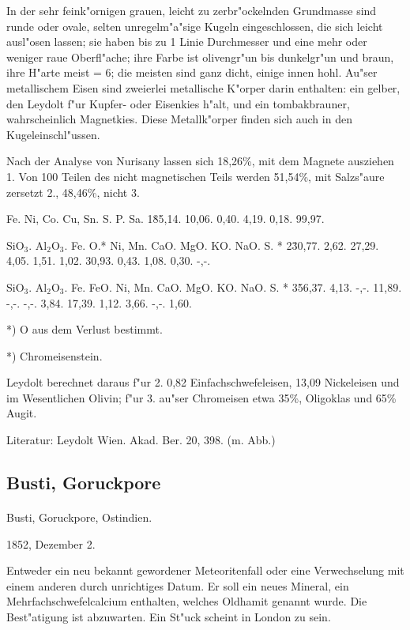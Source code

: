 \documentclass[a4paper, 11pt, oneside]{article}
\begin{document}
In der sehr feink"ornigen grauen, leicht zu zerbr"ockelnden Grundmasse sind runde oder ovale, selten unregelm"a"sige Kugeln eingeschlossen, die sich leicht ausl"osen lassen; sie haben bis zu 1 Linie Durchmesser und eine mehr oder weniger raue Oberfl"ache; ihre Farbe ist olivengr"un bis dunkelgr"un und braun, ihre H"arte meist = 6; die meisten sind ganz dicht, einige innen hohl. Au"ser metallischem Eisen sind zweierlei metallische K"orper darin enthalten: ein gelber, den Leydolt f"ur Kupfer- oder Eisenkies h"alt, und ein tombakbrauner, wahrscheinlich Magnetkies. Diese Metallk"orper finden sich auch in den Kugeleinschl"ussen.

Nach der Analyse von Nurisany lassen sich 18,26\%, mit dem Magnete ausziehen 1. Von 100 Teilen des nicht magnetischen Teils werden 51,54\%, mit Salzs"aure zersetzt 2., 48,46\%, nicht 3.

Fe. Ni, Co. Cu, Sn. S. P. Sa.  
1\. 85,14. 10,06. 0,40. 4,19. 0,18. 99,97.  

SiO$_{3}$. Al$_{2}$O$_{3}$. Fe. O.* Ni, Mn. CaO. MgO. KO. NaO. S. *  
2\. 30,77. 2,62. 27,29. 4,05. 1,51. 1,02. 30,93. 0,43. 1,08. 0,30. -,-.

SiO$_{3}$. Al$_{2}$O$_{3}$. Fe. FeO. Ni, Mn. CaO. MgO. KO. NaO. S. *  
3\. 56,37. 4,13. -,-. 11,89. -,-. -,-. 3,84. 17,39. 1,12. 3,66. -,-. 1,60.

*) O aus dem Verlust bestimmt.

*) Chromeisenstein.

Leydolt berechnet daraus f"ur 2. 0,82 Einfachschwefeleisen, 13,09 Nickeleisen und im Wesentlichen Olivin; f"ur 3. au"ser Chromeisen etwa 35\%, Oligoklas und 65\% Augit.

\footnotesize
Literatur: Leydolt Wien. Akad. Ber. 20, 398. (m. Abb.)

\subsection{Busti, Goruckpore}
\normalsize
\paragraph{}
Busti, Goruckpore, Ostindien.

1852, Dezember 2.

Entweder ein neu bekannt gewordener Meteoritenfall oder eine Verwechselung mit einem anderen durch unrichtiges Datum. Er soll ein neues Mineral, ein Mehrfachschwefelcalcium enthalten, welches Oldhamit genannt wurde. Die Best"atigung ist abzuwarten. Ein St"uck scheint in London zu sein.
\end{document}
